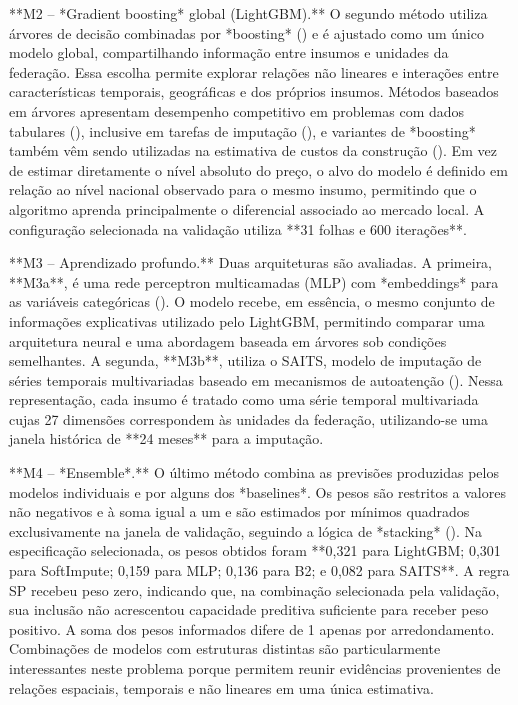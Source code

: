 **M2 – *Gradient boosting* global (LightGBM).** O segundo método utiliza árvores de 
decisão combinadas por *boosting* () e é ajustado como um único modelo 
global, compartilhando informação entre insumos e unidades da federação. Essa escolha 
permite explorar relações não lineares e interações entre características temporais, 
geográficas e dos próprios insumos. Métodos baseados em árvores apresentam desempenho 
competitivo em problemas com dados tabulares (), 
inclusive em tarefas de imputação (), e variantes de *boosting* também vêm sendo utilizadas na estimativa de custos da 
construção (). Em vez de 
estimar diretamente o nível absoluto do preço, o alvo do modelo é definido em relação ao 
nível nacional observado para o mesmo insumo, permitindo que o algoritmo aprenda 
principalmente o diferencial associado ao mercado local. A configuração selecionada na 
validação utiliza **31 folhas e 600 iterações**.

**M3 – Aprendizado profundo.** Duas arquiteturas são avaliadas. A primeira, **M3a**, 
é uma rede perceptron multicamadas (MLP) com *embeddings* para as variáveis categóricas 
(). O modelo recebe, em essência, o mesmo conjunto de informações 
explicativas utilizado pelo LightGBM, permitindo comparar uma arquitetura neural e uma 
abordagem baseada em árvores sob condições semelhantes. A segunda, **M3b**, utiliza o 
SAITS, modelo de imputação de séries temporais multivariadas baseado em mecanismos de 
autoatenção (). Nessa representação, cada insumo é tratado como uma 
série temporal multivariada cujas 27 dimensões correspondem às unidades da federação, 
utilizando-se uma janela histórica de **24 meses** para a imputação.

**M4 – *Ensemble*.** O último método combina as previsões produzidas pelos modelos 
individuais e por alguns dos *baselines*. Os pesos são restritos a valores não negativos 
e à soma igual a um e são estimados por mínimos quadrados exclusivamente na janela de 
validação, seguindo a lógica de *stacking* (). Na especificação selecionada, 
os pesos obtidos foram **0,321 para LightGBM; 0,301 para SoftImpute; 0,159 para MLP; 
0,136 para B2; e 0,082 para SAITS**. A regra SP recebeu peso zero, indicando que, na 
combinação selecionada pela validação, sua inclusão não acrescentou capacidade preditiva 
suficiente para receber peso positivo. A soma dos pesos informados difere de 1 apenas 
por arredondamento. Combinações de modelos com estruturas distintas são particularmente 
interessantes neste problema porque permitem reunir evidências provenientes de relações 
espaciais, temporais e não lineares em uma única estimativa.

